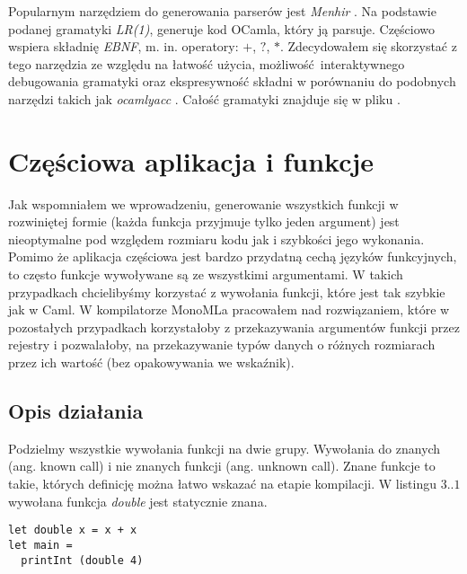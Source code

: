 \documentclass[declaration,shortabstract]{iithesis}
\begin{document}
Popularnym narzędziem do generowania parserów jest \textit{Menhir} \cite{menhir}. Na 
\newline podstawie podanej gramatyki \textit{LR(1)}, generuje kod OCamla, 
który ją parsuje. Częściowo wspiera składnię \textit{EBNF}, m. in. operatory: $
+$, $?$, $\ast$. Zdecydowałem się skorzystać z tego narzędzia ze względu na 
łatwość użycia, możliwość interaktywnego debugowania gramatyki oraz 
ekspresywność składni w porównaniu do podobnych narzędzi takich jak \textit
{ocamlyacc} \cite{menhir}. Całość gramatyki znajduje się w pliku 
. 

\section{Częściowa aplikacja i funkcje}

Jak wspomniałem we wprowadzeniu, generowanie wszystkich funkcji w rozwiniętej 
formie (każda funkcja przyjmuje tylko jeden argument) jest nieoptymalne pod
względem rozmiaru kodu jak i szybkości jego wykonania. Pomimo że aplikacja 
częściowa jest bardzo przydatną cechą języków funkcyjnych, to często funkcje
wywoływane są ze wszystkimi argumentami. W takich przypadkach chcielibyśmy 
korzystać z wywołania funkcji, które jest tak szybkie jak w Caml. 
W kompilatorze MonoMLa pracowałem nad rozwiązaniem, które w pozostałych 
przypadkach korzystałoby z przekazywania argumentów funkcji przez rejestry i 
pozwalałoby, na przekazywanie typów danych o różnych rozmiarach przez ich 
wartość (bez opakowywania we wskaźnik). 

\subsection{Opis działania}

Podzielmy wszystkie wywołania funkcji na dwie grupy. Wywołania do znanych 
(ang. known call) i nie znanych funkcji (ang. unknown call). Znane funkcje to 
takie, których definicję można łatwo wskazać na etapie kompilacji. 
W listingu $3..1$ wywołana funkcja \textit{double} jest statycznie znana.

\begin{lstlisting}[frame=single, caption=Wywołanie statycznie znanej funkcji.] 
let double x = x + x
let main = 
  printInt (double 4)
\end{lstlisting}
\end{document}
